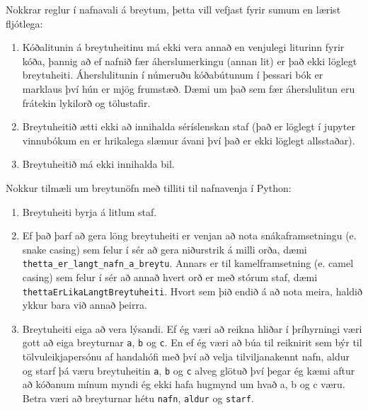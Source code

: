 Nokkrar reglur í nafnavali á breytum, þetta vill vefjast fyrir sumum en lærist fljótlega:
\vspace{0.5cm}
\begin{enumerate}
	\item Kóðalitunin á breytuheitinu má ekki vera annað en venjulegi liturinn fyrir kóða, þannig að ef nafnið fær áherslumerkingu (annan lit) er það ekki löglegt breytuheiti. 
	Áherslulitunin í númeruðu kóðabútunum í þessari bók er marklaus því hún er mjög frumstæð.
	Dæmi um það sem fær áherslulitun eru frátekin lykilorð og tölustafir.
	\item Breytuheitið ætti ekki að innihalda séríslenskan staf (það er löglegt í jupyter vinnubókum en er hrikalega slæmur ávani því það er ekki löglegt allsstaðar).
	\item Breytuheitið má ekki innihalda bil.
\end{enumerate}
\vspace{0.5cm}
Nokkur tilmæli um breytunöfn með tilliti til nafnavenja í Python:
\vspace{0.5cm}
\begin{enumerate}
	\item Breytuheiti byrja á litlum staf.
	\item Ef það þarf að gera löng breytuheiti er venjan að nota snákaframsetningu (e. snake casing) sem felur í sér að gera niðurstrik á milli orða, dæmi \texttt{thetta\_er\_langt\_nafn\_a\_breytu}.
	Annars er til kamelframsetning (e. camel casing) sem felur í sér að annað hvert orð er með stórum staf, dæmi \texttt{thettaErLikaLangtBreytuheiti}.
	Hvort sem þið endið á að nota meira, haldið ykkur bara við annað þeirra.
	\item Breytuheiti eiga að vera lýsandi.
	Ef ég væri að reikna hliðar í þríhyrningi væri gott að eiga breyturnar \texttt{a}, \texttt{b} og \texttt{c}.
	En ef ég væri að búa til reiknirit sem býr til tölvuleikjapersónu af handahófi með því að velja tilviljanakennt nafn, aldur og starf þá væru breytuheitin \texttt{a}, \texttt{b} og \texttt{c} alveg glötuð því þegar ég kæmi aftur að kóðanum mínum myndi ég ekki hafa hugmynd um hvað a, b og c væru. 
	Betra væri að breyturnar hétu \texttt{nafn}, \texttt{aldur} og \texttt{starf}.
\end{enumerate}

